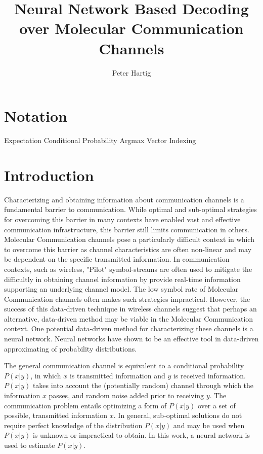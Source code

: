 \documentclass[12pt,a4paper]{report}
\title{Neural Network Based Decoding over Molecular Communication Channels}
\author{Peter Hartig}
\begin{document}
\maketitle

\begin{abstract}

\end{abstract}

\newpage
\tableofcontents
\newpage
\section{Notation}
Expectation
Conditional Probability 
Argmax
Vector Indexing

\section{Introduction}
Characterizing and obtaining information about communication channels is a fundamental barrier to communication. While optimal and sub-optimal strategies for overcoming this barrier in many contexts have enabled vast and effective communication infrastructure, this barrier still limits communication in others. Molecular Communication channels pose a particularly difficult context in which to overcome this barrier as channel characteristics are often non-linear and may be dependent on the specific transmitted information.
In communication contexts, such as wireless, "Pilot" symbol-streams are often used to mitigate the difficultly in obtaining channel information by provide real-time information supporting an underlying channel model. The low symbol rate of Molecular Communication channels often makes such strategies impractical. However, the success of this data-driven technique in wireless channels suggest that perhaps an alternative, data-driven method may be viable in the Molecular Communication context. One potential data-driven method for characterizing these channels is a neural network. Neural networks have shown to be an effective tool in data-driven approximating of probability distributions.
\par

The general communication channel is equivalent to a conditional probability $P(x|y)$, in which $x$ is transmitted information and $y$ is received information.  $P(x|y)$ takes into account the (potentially random) channel through which the information $x$ passes, and random noise added prior to receiving $y$. The communication problem entails optimizing a form of $P(x|y)$ over a set of possible, transmitted information $x$. In general, sub-optimal solutions do not require perfect knowledge of the distribution $P(x|y)$ and may be used when $P(x|y)$ is unknown or impractical to obtain. In this work, a neural network is used to estimate $P(x|y)$.
\end{document}
